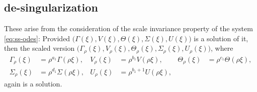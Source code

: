 \documentclass[a4paper,11pt]{article}
\def\red{\color{red}}
\begin{document}
\subsection{de-singularization}

These arise from the consideration of the scale invariance property of the system \eqref{eq:ss-odes}: Provided $\big(\Gamma(\xi), V(\xi), \Theta(\xi), \Sigma(\xi), U(\xi)\big)$ is a solution of it, then the scaled version $\big(\Gamma_\rho(\xi), V_\rho(\xi), \Theta_\rho(\xi), \Sigma_\rho(\xi), U_\rho(\xi)\big)$, where
\begin{align*}
 \Gamma_\rho(\xi)&=\rho^{a_1}\Gamma(\rho\xi), & V_\rho(\xi)&=\rho^{b_1}V(\rho\xi), & \Theta_\rho(\xi)&=\rho^{c_1}\Theta(\rho\xi),\\
 \Sigma_\rho(\xi)&=\rho^{d_1}\Sigma(\rho\xi), & U_\rho(\xi)&=\rho^{b_1+1}U(\rho\xi),
\end{align*}
again is a solution. 
\end{document}
